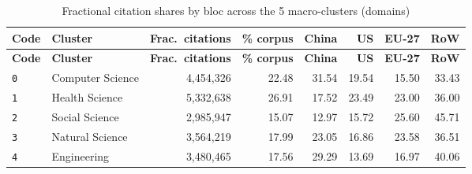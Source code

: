 \begin{longtable}{@{}l l r r r r r r@{}}
\caption{Fractional citation shares by bloc across the 5 macro-clusters (domains)}\label{tab:s1}\\
\toprule
\textbf{Code} & \textbf{Cluster} & \textbf{Frac.\ citations} & \textbf{\% corpus} & \textbf{China} & \textbf{US} & \textbf{EU-27} & \textbf{RoW} \\
\midrule
\endfirsthead
\toprule
\textbf{Code} & \textbf{Cluster} & \textbf{Frac.\ citations} & \textbf{\% corpus} & \textbf{China} & \textbf{US} & \textbf{EU-27} & \textbf{RoW} \\
\midrule
\endhead
\bottomrule
\endlastfoot
\texttt{0} & Computer Science & 4,454,326 & 22.48 & 31.54 & 19.54 & 15.50 & 33.43 \\
\texttt{1} & Health Science & 5,332,638 & 26.91 & 17.52 & 23.49 & 23.00 & 36.00 \\
\texttt{2} & Social Science & 2,985,947 & 15.07 & 12.97 & 15.72 & 25.60 & 45.71 \\
\texttt{3} & Natural Science & 3,564,219 & 17.99 & 23.05 & 16.86 & 23.58 & 36.51 \\
\texttt{4} & Engineering & 3,480,465 & 17.56 & 29.29 & 13.69 & 16.97 & 40.06 \\
\end{longtable}

